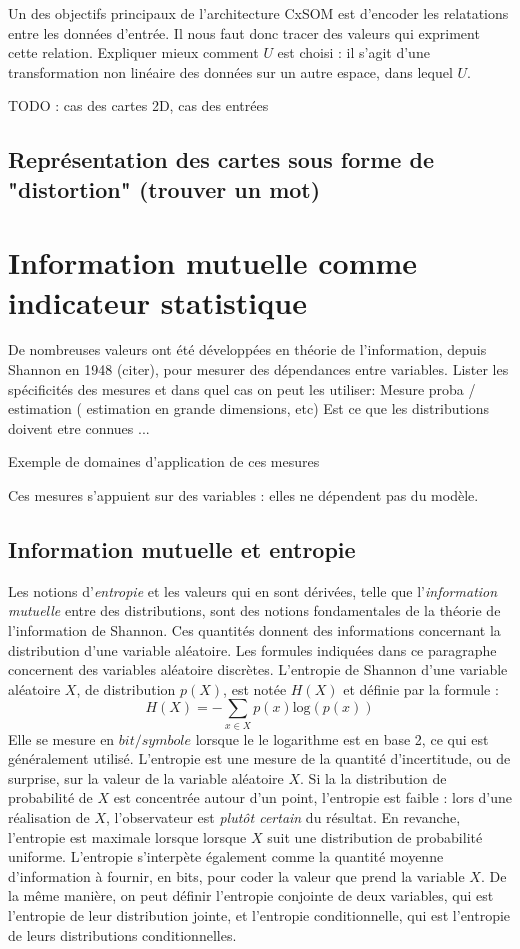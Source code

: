 Un des objectifs principaux de l'architecture CxSOM est d'encoder les relatations entre les données d'entrée. Il nous faut donc tracer des valeurs qui expriment cette relation. 
Expliquer mieux comment $U$ est choisi : il s'agit d'une transformation non linéaire des données sur un autre espace, dans lequel $U$.

TODO : cas des cartes 2D, cas des entrées 


\subsection{Représentation des cartes sous forme de "distortion" (trouver un mot)}



\section{Information mutuelle comme indicateur statistique}

De nombreuses valeurs ont été développées en théorie de l'information, depuis Shannon en 1948 (citer), pour mesurer des dépendances entre variables.
Lister les spécificités des mesures et dans quel cas on peut les utiliser: 
Mesure proba / estimation ( estimation en grande dimensions, etc)
Est ce que les distributions doivent etre connues ...

Exemple de domaines d'application de ces mesures

Ces mesures s'appuient sur des variables : elles ne dépendent pas du modèle. 

\subsection{Information mutuelle et entropie}

Les notions d'\emph{entropie} et les valeurs qui en sont dérivées, telle que l'\emph{information mutuelle} entre des distributions, sont des notions fondamentales de la théorie de l'information de Shannon. Ces quantités donnent des informations concernant la distribution d'une variable aléatoire.
Les formules indiquées dans ce paragraphe concernent des variables aléatoire discrètes. 
L'entropie de Shannon d'une variable aléatoire $X$, de distribution $p(X)$, est notée $H(X)$ et définie par la formule : 
$$ H(X) = - \sum_{x \in X}{p(x)\textrm{log}(p(x))}$$
Elle se mesure en $bit/symbole$ lorsque le le logarithme est en base 2, ce qui est généralement utilisé. 
L'entropie est une mesure de la quantité d'incertitude, ou de surprise, sur la valeur de la variable aléatoire $X$. Si la la distribution de probabilité de $X$ est concentrée autour d'un point, l'entropie est faible : lors d'une réalisation de $X$, l'observateur est \emph{plutôt certain} du résultat. En revanche, l'entropie est maximale lorsque lorsque $X$ suit une distribution de probabilité uniforme.
L'entropie s'interpète également comme la quantité moyenne d'information à fournir, en bits, pour coder la valeur que prend la variable $X$.
De la même manière, on peut définir l'entropie conjointe de deux variables, qui est l'entropie de leur distribution jointe, et l'entropie conditionnelle, qui est l'entropie de leurs distributions conditionnelles.

